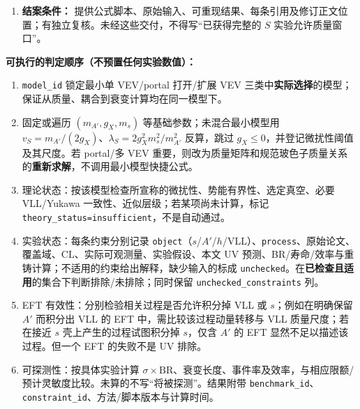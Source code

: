 \documentclass[
  chinese,
  UTF8]{ctexart}
\providecommand{\tightlist}{%
  \setlength{\itemsep}{0pt}\setlength{\parskip}{0pt}}
\begin{document}
\begin{enumerate}
  benchmark 表与一个标清假设的
  \texttt{(m\_\{A\textquotesingle{}\},g\_X)} 条件性切片；在 portal
  影响显著时应另配物理标量质量与混合参数的图，绝不可将未混合的
  \texttt{(m\_s,lambda\_\{HS\})} 关系直接等同物理质量谱。 \textbf{Major
  1.3 的联合扫描附加列（仅对 portal 已纳入的模型和适用能标）：} 记录
  \texttt{lambda\_HS(mu0)}、重整化方案与尺度、重 VLL
  阈值及独立轻轻子二点函数、\(h_1/h_2\)
  的物理质量/宽度、是否为近简并双态、该过程采用的混合角或完整传播幅度、Higgs
  rate/BR/实验 ID。若模型仅固定 \(\lambda_{HS}=0\)
  而未计算辐射稳定性，标记
  \texttt{portal\_assumption\_unverified}，不得据此将 Higgs
  限制栏置为``已证明不适用''；更不可直接使用 §2.2.1
  的未混合标量质量上界对混合物理态逐个裁切（详见 §2.5.1 E/F）。
\item
  \textbf{结案条件：}
  提供公式脚本、原始输入、可重现结果、每条引用及修订正文位置；有独立复核。未经这些交付，不得写``已获得完整的
  \(S\) 实验允许质量窗口''。
\end{enumerate}

\textbf{可执行的判定顺序（不预置任何实验数值）：}

\begin{enumerate}
\def\labelenumi{\arabic{enumi}.}
\tightlist
\item
  \texttt{model\_id} 锁定最小单 VEV/portal 打开/扩展 VEV
  三类中\textbf{实际选择}的模型；保证从质量、耦合到衰变计算均在同一模型下。
\item
  固定或遍历 \((m_{A'},g_X,m_s)\) 等基础参数；未混合最小模型用
  \(v_S=m_{A'}/(2g_X)\)、\(\lambda_S=2g_X^2m_s^2/m_{A'}^2\) 反算，跳过
  \(g_X\leq0\)，并登记微扰性阈值及其尺度。若 portal/多 VEV
  重要，则改为质量矩阵和规范玻色子质量关系的\textbf{重新求解}，不调用最小模型快捷公式。
\item
  理论状态：按该模型检查所宣称的微扰性、势能有界性、选定真空、必要
  VLL/Yukawa 一致性、近似层级；若某项尚未计算，标记
  \texttt{theory\_status=insufficient}，不是自动通过。
\item
  实验状态：每条约束分别记录
  \texttt{object}（\(s\)/\(A'\)/\(h\)/VLL）、\texttt{process}、原始论文、覆盖域、CL、实际可观测量、实验假设、本文
  UV 预测、BR/寿命/效率与重铸计算；不适用的约束给出解释，缺少输入的标成
  \texttt{unchecked}。在\textbf{已检查且适用}的集合下判断排除/未排除；同时保留
  \texttt{unchecked\_constraints} 列。
\item
  EFT 有效性：分别检验相关过程是否允许积分掉 VLL 或
  \(s\)；例如在明确保留 \(A'\) 而积分出 VLL 的 EFT
  中，需比较该过程动量转移与 VLL 质量尺度；若在接近 \(s\)
  壳上产生的过程试图积分掉 \(s\)，仅含 \(A'\) 的 EFT
  显然不足以描述该过程。但一个 EFT 的失败不是 UV 排除。
\item
  可探测性：按具体实验计算
  \(\sigma\times\mathrm{BR}\)、衰变长度、事件率及效率，与相应限额/预计灵敏度比较。未算的不写``将被探测''。结果附带
  \texttt{benchmark\_id}、\texttt{constraint\_id}、方法/脚本版本与计算时间。
\end{enumerate}
\end{document}
